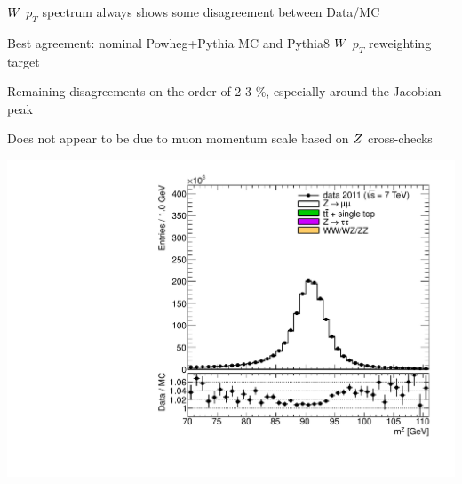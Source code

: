 {
\iteb
\item $W$ $p_{T}$ spectrum always shows some disagreement between Data/MC
\item Best agreement: nominal Powheg+Pythia MC and Pythia8 $W$ $p_{T}$ reweighting target
\item Remaining disagreements on the order of 2-3 \%, especially around the Jacobian peak
\item Does not appear to be due to muon momentum scale based on $Z$ cross-checks
\itee
}

{
\includegraphics[height=0.9\textheight]{dates/20121119/figures/zplots/zm_nomatch.pdf}
}
